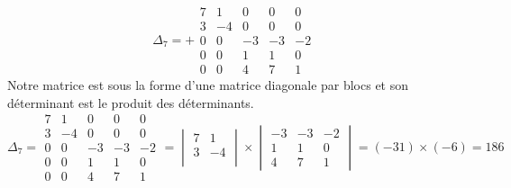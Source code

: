 {{$$\Delta_7=+\begin{array}{|ccccc|} 
7&1&0&0&0 \\ 3&-4&0&0&0 \\  0&0&-3&-3&-2 \\ 0&0&1&1&0 \\ 0&0&4&7&1  
\end{array}$$
Notre matrice est sous la forme d'une matrice diagonale par blocs
 et son déterminant est le produit des déterminants.
$$\Delta_7=\begin{array}{|cc|ccc|} 
7&1&0&0&0 \\ 3&-4&0&0&0 \\ \hline 0&0&-3&-3&-2 \\ 0&0&1&1&0 \\ 0&0&4&7&1  
\end{array}
= \begin{vmatrix}
 7&1 \\  3&-4 \\  
  \end{vmatrix} \times
\begin{vmatrix}
 -3&-3&-2 \\  1&1&0 \\  4&7&1  
  \end{vmatrix}
= (-31)\times (-6) = 186
$$
}
}
